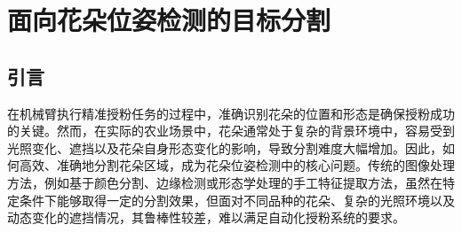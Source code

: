 
\chapter{面向花朵位姿检测的目标分割}\label{ch:3} \label{dectection}
\iffalse
\section{引言}
在现代农业中，自动化授粉技术正在成为解决劳动力短缺、提高作物产量和品质的重要手段。其中，机械臂柔顺控制的精准授粉任务对环境感知能力提出了极高的要求。要实现高效、稳定的授粉操作，机械臂需要能够准确感知花朵的空间特征，包括位置、形态、朝向等信息。这些信息的准确性直接决定了授粉的成功率和稳定性，因此，位姿检测是精准授粉技术的关键环节。

为了感知环境信息，机器人通常依赖各种传感器，例如RGB摄像头、深度相机、激光雷达等。其中，RGB-D深度相机由于能够同时提供彩色信息和深度信息，且成本较低，成为农业领域常用的视觉传感器。然而，在复杂的温室或田间环境中，由于光照条件的变化、花朵表面反射特性、叶片遮挡等因素，深度相机采集的数据往往存在噪声、空洞、误差等问题，导致位姿检测精度下降。因此，在使用深度相机数据进行位姿估计前，必须对其进行预处理，包括深度数据修正、去噪、补全等，以确保位姿信息的准确性。

此外，为了便于人机交互和授粉轨迹规划，本章提出了一种基于对称空间的花朵位姿检测方法，能够实时构建虚拟空间并同步更新授粉目标花朵的三维位置和朝向信息。该方法可以计算空间中花朵的位姿，为机械臂的授粉任务提供直观、准确的位姿参考信息，并为后续优化机械臂的运动轨迹提供数据。本章方法的整体技术路线主要包括目标分割、深度校正和位姿估计三个部分：首先，使用基于深度学习的实例分割方法对花朵区域进行精确提取；其次，采用深度校正算法对RGB-D相机采集的数据进行优化，以减少噪声并提高深度信息的可靠性；最后，结合三维重建技术，估计花朵的位姿信息。
\fi
\section{引言}

在机械臂执行精准授粉任务的过程中，准确识别花朵的位置和形态是确保授粉成功的关键。然而，在实际的农业场景中，花朵通常处于复杂的背景环境中，容易受到光照变化、遮挡以及花朵自身形态变化的影响，导致分割难度大幅增加。因此，如何高效、准确地分割花朵区域，成为花朵位姿检测中的核心问题。传统的图像处理方法，例如基于颜色分割、边缘检测或形态学处理的手工特征提取方法，虽然在特定条件下能够取得一定的分割效果，但面对不同品种的花朵、复杂的光照环境以及动态变化的遮挡情况，其鲁棒性较差，难以满足自动化授粉系统的要求。

